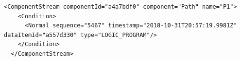 \begin{lstlisting}[firstnumber=last,escapechar=|,%
    caption={Path Logic Program Back to Normal, All Clear},label={lst:path-logic-program-condition-6}]
  <ComponentStream componentId="a4a7bdf0" component="Path" name="P1">
    <Condition>
      <Normal sequence="5467" timestamp="2018-10-31T20:57:19.9981Z" dataItemId="a557d330" type="LOGIC_PROGRAM"/>
    </Condition>
  </ComponentStream>
\end{lstlisting}


